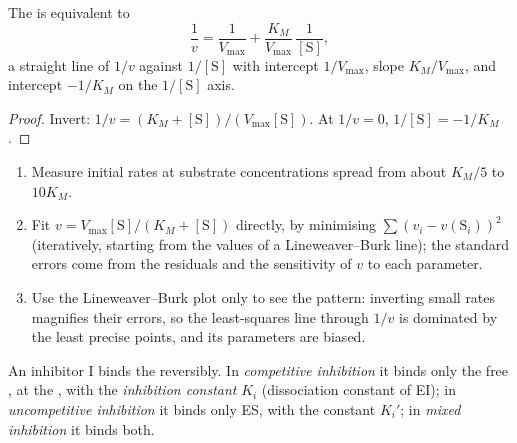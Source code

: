 \begin{proposition}\label{prop:b3:complex-kinetics:lineweaver}
The  is equivalent to
\[
  \frac1v = \frac{1}{V_{\max}} + \frac{K_M}{V_{\max}}\,\frac{1}{[\mathrm S]},
\]
a straight line of $1/v$ against $1/[\mathrm S]$ with intercept $1/V_{\max}$, slope $K_M/V_{\max}$, and
intercept $-1/K_M$ on the $1/[\mathrm S]$ axis.
\end{proposition}

\begin{proof}
Invert: $1/v = (K_M + [\mathrm S])/(V_{\max}[\mathrm S])$. At $1/v = 0$, $1/[\mathrm S] = -1/K_M$.
\end{proof}

\begin{method}\label{met:b3:complex-kinetics:mm-fit}
\begin{enumerate}
  \item Measure initial rates at substrate concentrations spread from about
        $K_M/5$ to $10K_M$.
  \item Fit $v = V_{\max}[\mathrm S]/(K_M + [\mathrm S])$ directly, by minimising $\sum(v_i - v(\mathrm S_i))^2$ (iteratively,
        starting from the values of a Lineweaver--Burk line); the standard
        errors come from the residuals and the sensitivity of $v$ to each
        parameter.
  \item Use the Lineweaver--Burk plot only to see the pattern: inverting small
        rates magnifies their errors, so the least-squares line through $1/v$
        is dominated by the least precise points, and its parameters are
        biased.
\end{enumerate}
\end{method}

\begin{definition}[Inhibition]\label{def:b3:complex-kinetics:inhibition}
An inhibitor I binds the  reversibly. In \emph{competitive
inhibition} it binds only the free , at the
, with the \emph{inhibition constant} $K_i$
(dissociation constant of EI); in \emph{uncompetitive inhibition}
it binds only ES, with the constant $K_i'$; in \emph{mixed
inhibition} it binds both.
\end{definition}


